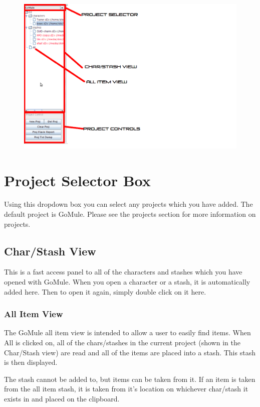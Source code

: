 \documentclass[a4paper,10pt]{article}
\begin{document}
\begin{figure}[htp]
\centering
 \includegraphics[width=140mm]{leftpane.png}
\end{figure}

\section{Project Selector Box}

Using this dropdown box you can select any projects which you have added. The default project is GoMule. Please see the projects section for more information on projects.

\subsection{Char/Stash View}

This is a fast access panel to all of the characters and stashes which you have opened with GoMule. When you open a character or a stash, it is automatically added here. Then to open it again, simply double click on it here.

\subsubsection{All Item View}

The GoMule all item view is intended to allow a user to easily find items. When All is clicked on, all of the chars/stashes in the current project (shown in the Char/Stash view) are read and all of the items are placed into a stash. This stash is then displayed.

The stash cannot be added to, but items can be taken from it. If an item is taken from the all item stash, it is taken from it's location on whichever char/stash it exists in and placed on the clipboard. 
\end{document}
